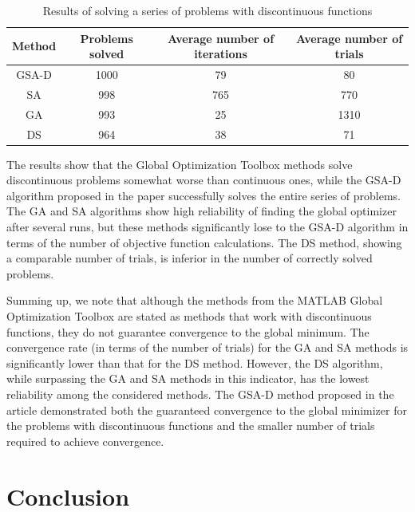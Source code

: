 \documentclass[runningheads]{llncs}
\begin{document}
\begin{table}[ht]
	\caption{Results of solving a series of problems with discontinuous functions}
	\label{tab2}
	\begin{center}
		\begin{tabular}{c|c|c|c}
			\hline
			Method & Problems solved & Average number of iterations & Average number of trials \\
			\hline
                                GSA-D & 1000  & 79  &  80 \\
                                \hline
                                SA    &  998  &  765  &  770  \\
			\hline
			GA    &   993  &  25  &  1310  \\
			\hline
                                DS    &  964  & 38  &  71  \\
			\hline
		\end{tabular}
	\end{center}
\end{table}

The results show that the Global Optimization Toolbox methods solve discontinuous problems somewhat worse than continuous ones, while the GSA-D algorithm proposed in the paper successfully solves the entire series of problems. The GA and SA algorithms show high reliability of finding the global optimizer after several runs, but these methods significantly lose to the GSA-D algorithm in terms of the number of objective function calculations. The DS method, showing a comparable number of trials, is inferior in the number of correctly solved problems.

Summing up, we note that although the methods from the MATLAB Global Optimization Toolbox are stated as methods that work with discontinuous functions, they do not guarantee convergence to the global minimum. The convergence rate (in terms of the number of trials) for the GA and SA methods is significantly lower than that for the DS method. However, the DS algorithm, while surpassing the GA and SA methods in this indicator, has the lowest reliability among the considered methods. The GSA-D method proposed in the article demonstrated both the guaranteed convergence to the global minimizer for the problems with discontinuous functions and the smaller number of trials required to achieve convergence.

\section{Conclusion}
\end{document}
